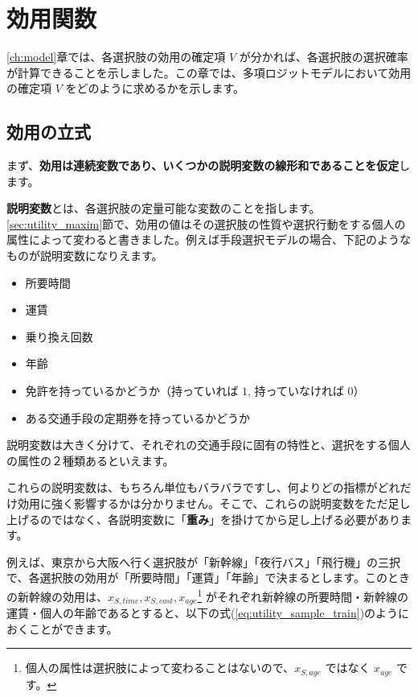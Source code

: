 \chapter{効用関数}\label{ch:utility}

\ref{ch:model}章では、各選択肢の効用の確定項 $V$ が分かれば、各選択肢の選択確率が計算できることを示しました。この章では、多項ロジットモデルにおいて効用の確定項 $V$ をどのように求めるかを示します。

\section{効用の立式}\label{sec:utility}

まず、\textbf{効用は連続変数であり、いくつかの説明変数の線形和であることを仮定}します。

\textbf{説明変数}とは、各選択肢の定量可能な変数のことを指します。\ref{sec:utility_maxim}節で、効用の値はその選択肢の性質や選択行動をする個人の属性によって変わると書きました。例えば手段選択モデルの場合、下記のようなものが説明変数になりえます。

\begin{itemize}
    \item 所要時間
    \item 運賃
    \item 乗り換え回数
    \item 年齢
    \item 免許を持っているかどうか（持っていれば $1$, 持っていなければ $0$）
    \item ある交通手段の定期券を持っているかどうか
\end{itemize}

説明変数は大きく分けて、それぞれの交通手段に固有の特性と、選択をする個人の属性の２種類あるといえます。

これらの説明変数は、もちろん単位もバラバラですし、何よりどの指標がどれだけ効用に強く影響するかは分かりません。そこで、これらの説明変数をただ足し上げるのではなく、各説明変数に「\textbf{重み}」を掛けてから足し上げる必要があります。

例えば、東京から大阪へ行く選択肢が「新幹線」「夜行バス」「飛行機」の三択で、各選択肢の効用が「所要時間」「運賃」「年齢」で決まるとします。このときの新幹線の効用は、$x_{S,time}, x_{S,cost}, x_{age}$\footnote{個人の属性は選択肢によって変わることはないので、$x_{S,age}$ ではなく $x_{age}$ です。} がそれぞれ新幹線の所要時間・新幹線の運賃・個人の年齢であるとすると、以下の式(\ref{eq:utility_sample_train})のようにおくことができます。

